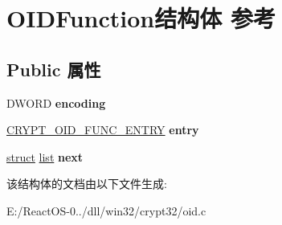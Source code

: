 \hypertarget{struct_o_i_d_function}{}\section{O\+I\+D\+Function结构体 参考}
\label{struct_o_i_d_function}
\subsection*{Public 属性}
\begin{DoxyCompactItemize}
\item 
\mbox{\label{struct_o_i_d_function_af897c0c1a944b3411ef3d9669c270f98}} 
D\+W\+O\+RD {\bfseries encoding}
\item 
\mbox{\label{struct_o_i_d_function_adf5e23d162c34bdf134575d9bc5c0b53}} 
\hyperlink{struct___c_r_y_p_t___o_i_d___f_u_n_c___e_n_t_r_y}{C\+R\+Y\+P\+T\+\_\+\+O\+I\+D\+\_\+\+F\+U\+N\+C\+\_\+\+E\+N\+T\+RY} {\bfseries entry}
\item 
\mbox{\label{struct_o_i_d_function_aeffaf68a917cbcf5c4a7be47ee5c29ea}} 
\hyperlink{interfacestruct}{struct} \hyperlink{classlist}{list} {\bfseries next}
\end{DoxyCompactItemize}


该结构体的文档由以下文件生成\+:\begin{DoxyCompactItemize}
\item 
E\+:/\+React\+O\+S-\/0../dll/win32/crypt32/oid.\+c\end{DoxyCompactItemize}
